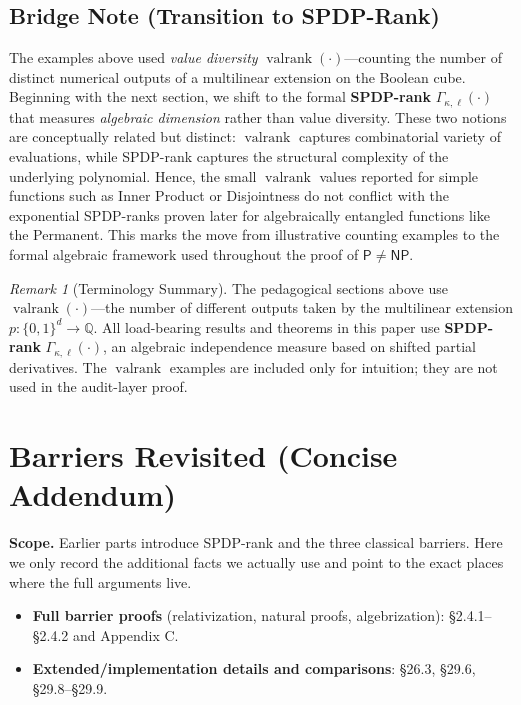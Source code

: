 \documentclass[12pt]{article}
\newcommand{\valrank}{\operatorname{valrank}}
\theoremstyle{definition}
\theoremstyle{definition}
\theoremstyle{remark}
\newtheorem{remark}{Remark}
\theoremstyle{remark}
\begin{document}

\subsection{Bridge Note (Transition to SPDP-Rank)}
\label{sec:bridge-note-rank}

The examples above used \emph{value diversity} $\valrank(\cdot)$---counting the number of distinct numerical outputs of a multilinear extension on the Boolean cube. Beginning with the next section, we shift to the formal \textbf{SPDP-rank} $\Gamma_{\kappa,\ell}(\cdot)$ that measures \textit{algebraic dimension} rather than value diversity. These two notions are conceptually related but distinct: $\valrank$ captures combinatorial variety of evaluations, while SPDP-rank captures the structural complexity of the underlying polynomial. Hence, the small $\valrank$ values reported for simple functions such as Inner Product or Disjointness do not conflict with the exponential SPDP-ranks proven later for algebraically entangled functions like the Permanent. This marks the move from illustrative counting examples to the formal algebraic framework used throughout the proof of $\mathsf{P} \neq \mathsf{NP}$.

\begin{remark}[Terminology Summary]
The pedagogical sections above use $\valrank(\cdot)$---the number of different outputs taken by the multilinear extension $p : \{0,1\}^d \to \mathbb{Q}$.
All load-bearing results and theorems in this paper use \textbf{SPDP-rank} $\Gamma_{\kappa,\ell}(\cdot)$, an algebraic independence measure based on shifted partial derivatives.
The $\valrank$ examples are included only for intuition; they are not used in the audit-layer proof.
\end{remark}

\section{Barriers Revisited (Concise Addendum)}

\textbf{Scope.} Earlier parts introduce SPDP-rank and the three classical barriers. Here we only record the additional facts we actually use and point to the exact places where the full arguments live.

\begin{itemize}
\item \textbf{Full barrier proofs} (relativization, natural proofs, algebrization): \S2.4.1--\S2.4.2 and Appendix C.
\item \textbf{Extended/implementation details and comparisons}: \S26.3, \S29.6, \S29.8--\S29.9.
\end{itemize}
\end{document}
